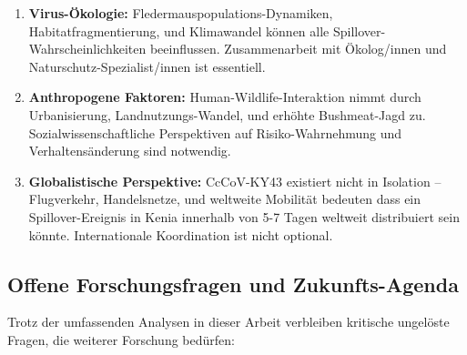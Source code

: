 ﻿\documentclass[11pt,a4paper]{article}
\theoremstyle{definition}
\begin{document}
\begin{enumerate}
\item \textbf{Virus-Ökologie:} Fledermauspopulations-Dynamiken, Habitatfragmentierung, und Klimawandel können alle Spillover-Wahrscheinlichkeiten beeinflussen. Zusammenarbeit mit Ökolog/innen und Naturschutz-Spezialist/innen ist essentiell.

\item \textbf{Anthropogene Faktoren:} Human-Wildlife-Interaktion nimmt durch Urbanisierung, Land\-nutzungs-Wandel, und erhöhte Bushmeat-Jagd zu. Sozialwissenschaftliche Perspektiven auf Risiko-Wahrnehmung und Verhaltensänderung sind notwendig.

\item \textbf{Globalistische Perspektive:} CcCoV-KY43 existiert nicht in Isolation -- Flugverkehr, Handelsnetze, und weltweite Mobilität bedeuten dass ein Spillover-Ereignis in Kenia innerhalb von 5-7 Tagen weltweit distribuiert sein könnte. Internationale Koordination ist nicht optional.
\end{enumerate}

\subsection{Offene Forschungsfragen und Zukunfts-Agenda}

Trotz der umfassenden Analysen in dieser Arbeit verbleiben kritische ungelöste Fragen, die weiterer Forschung bedürfen:
\end{document}
